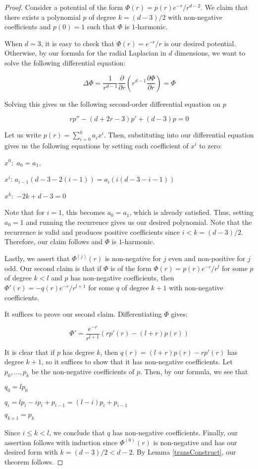 \begin{proof}
Consider a potential of the form $\Phi(r) = p(r)e^{-r}/r^{d-2}$. We claim that there exists a polynomial $p$ of degree $k = (d-3)/2$ with non-negative coefficients and $p(0) = 1$ such that $\Phi$ is $1$-harmonic.

When $d = 3$, it is easy to check that $\Phi(r) = e^{-r}/r$ is our desired potential. Otherwise, by our formula for the radial Laplacian in $d$ dimensions, we want to solve the following differential equation:

\[\Delta \Phi =  \frac{1}{r^{d-1}} \frac{\partial}{\partial r} (r^{d-1} \frac{\partial \Phi}{\partial r}) = \Phi\]

Solving this gives us the following second-order differential equation on $p$

\[rp'' - (d+2r-3)p' +(d-3)p = 0\]

Let us write $p(r) = \sum_{i=0}^k a_i x^i$. Then, substituting into our differential equation gives us the following equations by setting each coefficient of $x^i$ to zero:

$x^0:$ $a_0 = a_1$,

$x^i$:  $a_{i-1}(d-3 - 2(i-1)) = a_i (i(d-3 - i-1))$

$x^k:$ $-2k +d-3 = 0$

Note that for $i = 1$, this becomes $a_0 = a_1$, which is already satisfied. Thus, setting $a_0 = 1$ and running the recurrence gives us our desired polynomial. Note that the recurrence is valid and produces positive coefficients since $i < k  = (d-3)/2$. Therefore, our claim follows and $\Phi$ is $1$-harmonic.

Lastly, we assert that $\Phi^{(j)}(r)$ is non-negative for $j$ even and non-positive for $j$ odd. Our second claim is that if $\Phi$ is of the form $\Phi(r) = p(r) e^{-r}/r^{l}$ for some $p$ of degree $k < l$ and $p$ has non-negative coefficients, then $\Phi'(r) = - q(r) e^{-r}/r^{l+1}$ for some $q$ of degree $k+1$ with non-negative coefficients. 

It suffices to prove our second claim. Differentiating $\Phi$ gives:

\[\Phi' = \frac{e^{-r}}{r^{l+1}} (rp'(r) - (l + r)p(r))\]

It is clear that if $p$ has degree $k$, then $q(r) = (l+r)p(r) - rp'(r)$ has degree $k+1$, so it suffices to show that it has non-negative coefficients. Let $p_0,..., p_k$ be the non-negative coefficients of $p$. Then, by our formula, we see that 

$q_0 = l p_0$

$q_i = lp_i - ip_i + p_{i-1} = (l-i)p_i + p_{i-1}$ 

$q_{k+1} = p_k$

Since $i \leq k < l$, we conclude that $q$ has non-negative coefficients. Finally, our assertion follows with induction since $\Phi^{(0)}(r)$ is non-negative and has our desired form with $k = (d-3)/2 < d-2$. By Lemma \ref{transConstruct}, our theorem follows.
\end{proof}

